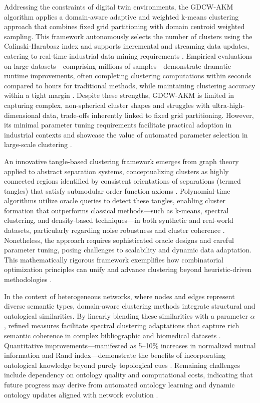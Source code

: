 \documentclass[sigconf]{acmart}
\begin{document}
Addressing the constraints of digital twin environments, the GDCW-AKM algorithm applies a domain-aware adaptive and weighted k-means clustering approach that combines fixed grid partitioning with domain centroid weighted sampling. This framework autonomously selects the number of clusters using the Calinski-Harabasz index and supports incremental and streaming data updates, catering to real-time industrial data mining requirements \cite{ref20}. Empirical evaluations on large datasets—comprising millions of samples—demonstrate dramatic runtime improvements, often completing clustering computations within seconds compared to hours for traditional methods, while maintaining clustering accuracy within a tight margin \cite{ref20}. Despite these strengths, GDCW-AKM is limited in capturing complex, non-spherical cluster shapes and struggles with ultra-high-dimensional data, trade-offs inherently linked to fixed grid partitioning. However, its minimal parameter tuning requirements facilitate practical adoption in industrial contexts and showcase the value of automated parameter selection in large-scale clustering \cite{ref20}.

An innovative tangle-based clustering framework emerges from graph theory applied to abstract separation systems, conceptualizing clusters as highly connected regions identified by consistent orientations of separations (termed tangles) that satisfy submodular order function axioms \cite{ref13}. Polynomial-time algorithms utilize oracle queries to detect these tangles, enabling cluster formation that outperforms classical methods—such as k-means, spectral clustering, and density-based techniques—in both synthetic and real-world datasets, particularly regarding noise robustness and cluster coherence \cite{ref13}. Nonetheless, the approach requires sophisticated oracle designs and careful parameter tuning, posing challenges to scalability and dynamic data adaptation. This mathematically rigorous framework exemplifies how combinatorial optimization principles can unify and advance clustering beyond heuristic-driven methodologies \cite{ref13}.

In the context of heterogeneous networks, where nodes and edges represent diverse semantic types, domain-aware clustering methods integrate structural and ontological similarities. By linearly blending these similarities with a parameter \(\alpha\), refined measures facilitate spectral clustering adaptations that capture rich semantic coherence in complex bibliographic and biomedical datasets \cite{ref14}. Quantitative improvements—manifested as 5–10\% increases in normalized mutual information and Rand index—demonstrate the benefits of incorporating ontological knowledge beyond purely topological cues \cite{ref14}. Remaining challenges include dependency on ontology quality and computational costs, indicating that future progress may derive from automated ontology learning and dynamic ontology updates aligned with network evolution \cite{ref14}.
\end{document}
